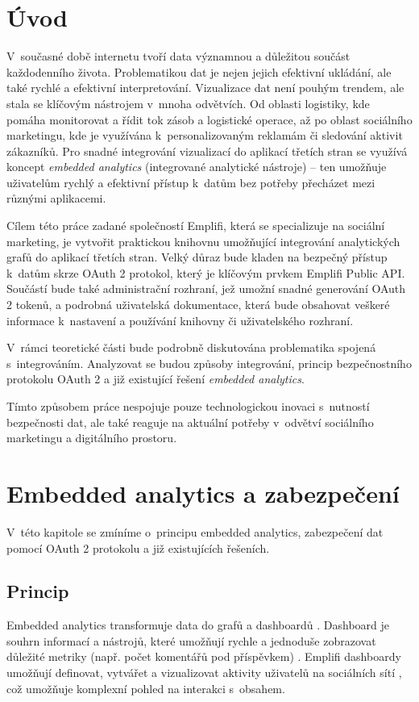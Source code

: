 \documentclass[czech, bc, kiv, he, iso690numb, viewonly]{fasthesis} %
\begin{document}
\chapter{Úvod}
V~současné době internetu tvoří data významnou a důležitou součást každodenního života. Problematikou dat je nejen jejich efektivní ukládání, 
ale také rychlé a efektivní interpretování. 
Vizualizace dat není pouhým trendem, ale stala se klíčovým nástrojem v~mnoha odvětvích. Od oblasti logistiky, kde pomáha monitorovat a řídit tok zásob a logistické operace, až po oblast sociálního marketingu, kde je využívána k~personalizovaným reklamám či sledování aktivit zákazníků. 
Pro snadné integrování vizualizací do aplikací třetích stran se využívá koncept \textit{embedded analytics} (integrované analytické nástroje) – ten umožňuje uživatelům rychlý a efektivní přístup k~datům bez potřeby přecházet mezi různými aplikacemi. 

Cílem této práce zadané společností Emplifi, která se specializuje na sociální marketing, je vytvořit praktickou knihovnu umožňující integrování analytických grafů do aplikací třetích stran. 
Velký důraz bude kladen na bezpečný přístup k~datům skrze OAuth 2 protokol, který je klíčovým prvkem Emplifi Public API. Součástí bude také administrační rozhraní, jež umožní snadné generování OAuth 2 tokenů, a podrobná uživatelská dokumentace, která bude obsahovat veškeré informace k~nastavení a používání knihovny či uživatelského rozhraní.

V~rámci teoretické části bude podrobně diskutována problematika spojená s~integrováním. Analyzovat se budou způsoby integrování, princip bezpečnostního protokolu OAuth 2 a již existující řešení \textit{embedded analytics}.

Tímto způsobem práce nespojuje pouze technologickou inovaci s~nutností bezpečnosti dat, ale také reaguje na aktuální potřeby v~odvětví sociálního marketingu a digitálního prostoru.
%
%
%
%
\chapter{Embedded analytics a zabezpečení}
V~této kapitole se zmíníme o~principu embedded analytics, zabezpečení dat pomocí OAuth 2 protokolu a již existujících řešeních.

%
%
\section{Princip}
Embedded analytics transformuje data do grafů a dashboardů \cite{goodDataEmbedded}. Dashboard je souhrn informací a nástrojů, které umožňují rychle a jednoduše zobrazovat důležité metriky (např. počet komentářů pod příspěvkem) \cite{coJeDashboard}.
Emplifi dashboardy umožňují definovat, vytvářet a vizualizovat aktivity uživatelů na sociálních sítí \cite{emplifiDashboard}, což umožňuje komplexní pohled na interakci s~obsahem.
\end{document}
